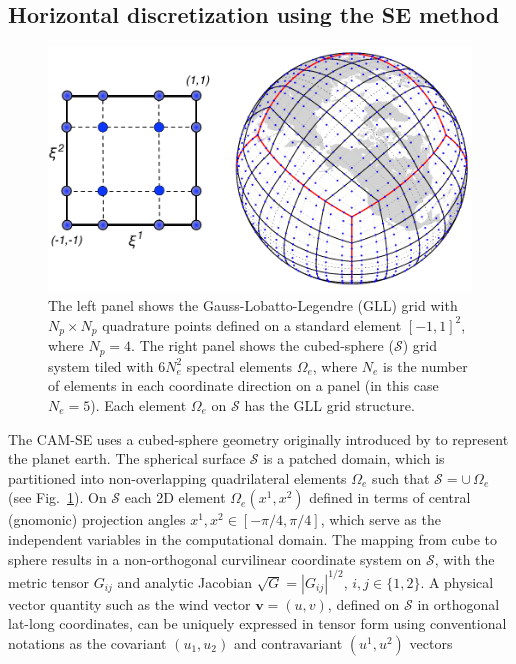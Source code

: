 \documentclass{agujournal}
\begin{document}
{\subsection{Horizontal discretization using the SE method}
  \begin{figure}[h]
\centering
 \includegraphics[scale=0.75]{figs/cs_gll4_2017}
 \caption{The left panel shows the  Gauss-Lobatto-Legendre (GLL)   grid with $ N_p \times  N_p$ quadrature points defined
 on a standard element $[-1,1]^2$, where $N_p=4$. The right panel shows the cubed-sphere ($\mathcal{S}$) grid system tiled with 
 $6 N_e^2 $ spectral elements $\Omega_e$, where $N_e$ is the number of elements  in each coordinate direction
 on a panel (in this case $N_e=5$). 
 Each element  $\Omega_e$ on $\mathcal{S}$ has the GLL grid structure.  }
 \label{fig:gll4}
\end{figure}
    The CAM-SE 
 uses a cubed-sphere geometry  originally introduced by \cite{S1972MWR}  to represent the planet earth. The  spherical   surface 
  $\mathcal{S}$ is  a patched domain,  which is partitioned  into   non-overlapping quadrilateral elements 
 $\Omega_e$ such that $\mathcal{S} = \cup \, \Omega_e$ (see Fig.~\ref{fig:gll4}). 
  On   $\mathcal{S}$  each 2D  element $\Omega_e(x^1,x^2)$  defined in terms of
 central  (gnomonic) projection angles $x^1,x^2 \in [-\pi/4, \pi/4]$, which serve as  the independent variables in the computational domain. 
 The mapping from cube to sphere results in a non-orthogonal curvilinear  coordinate system on $\mathcal{S}$, with 
 the  metric tensor $G_{ij}$ and  analytic Jacobian $ \sqrt{G} =  |G_{ij}|^{1/2}$, $i, j \in \{1,2\}$. 
 A  physical vector quantity  such as the wind vector $\mathbf{v} = (u,v)$,  defined on  $\mathcal{S}$
 in  orthogonal lat-long coordinates,  can  be uniquely
 expressed in tensor form using conventional notations as the covariant $(u_1,u_2)$ and contravariant  $(u^1, u^2)$ vectors 
}
\end{document}
